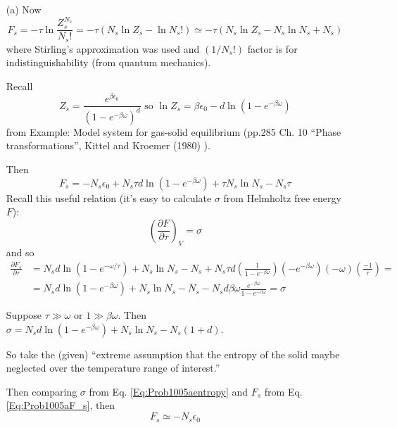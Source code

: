\documentclass[twoside]{amsart}
\theoremstyle{plain}
\theoremstyle{definition}
\begin{document}
\begin{enumerate}
\item[(a)] 
Now 
\[
F_s = -\tau \ln{ \frac{Z_s^{N_s} }{N_s!} } = -\tau \left( N_s \ln{Z_s} - \ln{N_s!} \right) \simeq -\tau ( N_s \ln{Z_s} - N_s \ln{N_s} + N_s )
\]
where Stirling's approximation was used and $(1/N_s!)$ factor is for indistinguishability (from quantum mechanics).  

Recall
\[
Z_s = \frac{e^{\beta \epsilon_0}}{ (1- e^{-\beta \omega})^d} \text{ so } \ln{Z_s} = \beta \epsilon_0 - d\ln{ (1-e^{-\beta \omega} )}
\]
from Example: Model system for gas-solid equilibrium (pp.285 Ch. 10 ``Phase transformations'', Kittel and Kroemer (1980) \cite{CKittelHKroemer1980}).  

Then
\begin{equation}\label{Eq:Prob1005aF_s}
  F_s = -N_s \epsilon_0 + N_s \tau d\ln{(1-e^{-\beta \omega} )} + \tau N_s \ln{ N_s} - N_s\tau
\end{equation}
Recall this useful relation (it's easy to calculate $\sigma$ from Helmholtz free energy $F$):
\[
\left( \frac{ \partial F}{ \partial \tau} \right)_V = \sigma
\]
and so
\begin{equation}\label{Eq:Prob1005aentropy}
\begin{aligned}
  \frac{ \partial F_s}{ \partial \tau} & = N_s d\ln{(1- e^{-\omega/\tau} )} + N_s \ln{ N_s} - N_s + N_s \tau d \left( \frac{1}{ 1 - e^{-\beta \omega} } \right)(-e^{-\beta \omega} )(-\omega)\left( \frac{-1}{\tau} \right) = \\
  & = N_s d\ln{ (1- e^{-\beta \omega} )} + N_s \ln{N_s} - N_s - N_s d\beta \omega \frac{e^{-\beta \omega} }{ 1 - e^{-\beta \omega} } = \sigma
\end{aligned}
\end{equation}


Suppose $\tau \gg \omega$ or $1 \gg \beta \omega$.  Then $\sigma = N_s d\ln{ (1-e^{-\beta \omega})} + N_s \ln{N_s} - N_s(1+d)$.  

So take the (given) ``extreme assumption that the entropy of the solid maybe neglected over the temperature range of interest.'' \cite{CKittelHKroemer1980}

Then comparing $\sigma$ from Eq. \ref{Eq:Prob1005aentropy} and $F_s$ from Eq. \ref{Eq:Prob1005aF_s}, then
\[
F_s \simeq -N_s \epsilon_0
\]



\end{enumerate}
\end{document}
